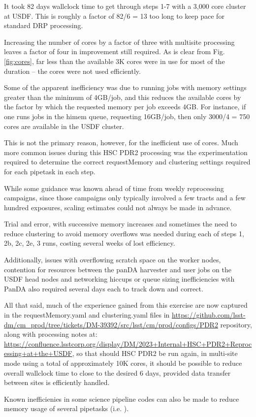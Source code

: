 It took 82 days wallclock time to get through 
steps 1-7 with a 3,000 core cluster at USDF.  
This is roughly a factor of 82/6 = 13 too long to keep pace for standard DRP processing.

Increasing the number of cores by a factor of three with multisite processing
leaves a factor of four in improvement still required.
As is clear from Fig. \ref{fig:cores}, far less than the available 3K cores
were in use for most of the duration -- the cores were not used
efficiently.

Some of the apparent inefficiency was due to running jobs with memory
settings greater than the minimum of 4GB/job, and this reduces the available
cores by the factor by which the requested memory per job exceeds 4GB.
For instance, if one runs jobs in the himem queue, requesting 16GB/job,
then only 3000/4 = 750 cores are available in the USDF cluster.

This is not the primary reason, however, for the inefficient use of cores.
Much more common issues during this HSC PDR2 processing was the 
experimentation required to  determine the correct requestMemory and clustering
settings required for each pipetask in each step.

While some guidance was known ahead of time from weekly reprocessing
campaigns, since those campaigns only typically involved a few tracts and
a few hundred exposures, scaling estimates could not always be made
in advance.

Trial and error, with successive memory increases and sometimes the need to
reduce clustering to avoid memory overflows was needed during each of
steps 1, 2b, 2c, 2e, 3 runs, costing several weeks of lost efficiency.

Additionally, issues with overflowing scratch space on the worker nodes,
contention for resources between the panDA harvester and user jobs on the 
USDF head nodes and networking hiccups or queue sizing inefficiencies 
with PanDA also required several days each to track down and correct.

All that said, much of the experience gained from this exercise are
now captured in the requestMemory.yaml and clustering.yaml files
in \url{https://github.com/lsst-dm/cm_prod/tree/tickets/DM-39392/src/lsst/cm/prod/configs/PDR2} repository, along with processing notes at:
\url{https://confluence.lsstcorp.org/display/DM/2023+Internal+HSC+PDR2+Reprocessing+at+the+USDF}, so that should HSC PDR2 be run again, in multi-site 
mode using a total of approximately 10K cores, it should be 
possible to reduce overall wallclock time to close to the desired 6 days,
provided data transfer between sites is efficiently handled.

Known inefficienies in some science pipeline codes can also be made to
reduce memory usage of several pipetasks (i.e. ).
